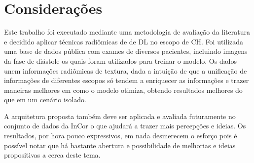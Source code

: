 \chapter{Considerações}
\label{chap:conclusao}

Este trabalho foi executado mediante uma metodologia de avaliação da literatura e decidido aplicar técnicas radiômicas de de \gls{DL} no escopo de CH. Foi utilizada uma base de dados pública com exames de diversos pacientes, incluindo imagens da fase de diástole os quais foram utilizados para treinar o modelo. Os dados unem informações radiômicas de textura, dada a intuição de que a unificação de informações de diferentes escopos só tendem a enriquecer as informações e trazer maneiras melhores em como o modelo otimiza, obtendo resultados melhores do que em um cenário isolado.

A arquitetura proposta também deve ser aplicada e avaliada futuramente no conjunto de dados da \gls{InCor} o que ajudará a trazer mais percepções e ideias. Os resultados, por hora pouco expressivos, em nada desmerecem o esforço pois é possível notar que há bastante abertura e possibilidade de melhorias e ideias propositivas a cerca deste tema. 